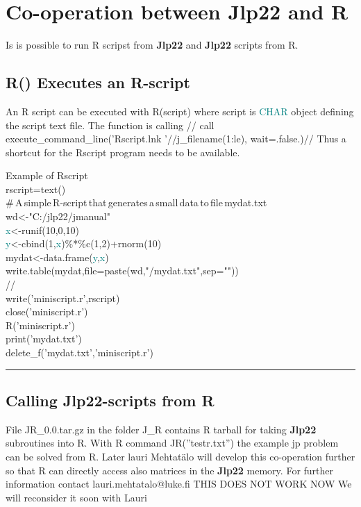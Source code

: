 \section{Co-operation between \textbf{Jlp22} and R} 
\label{JR} 
Is is possible to run R scripst from \textbf{Jlp22} and \textbf{Jlp22} scripts from R. 
\subsection{ \textcolor{VioletRed}{R}() Executes an R-script} 
\label{R} 
An R script can be executed with \textcolor{VioletRed}{R}(script) where script is \textcolor{teal}{CHAR} object 
defining the script text file. The function is calling // 
call execute\_command\_line('Rscript.lnk '//j\_filename(1:le), wait=.false.)// 
Thus a shortcut for the Rscript program needs to be available. 
\singlespacing 
\begin{example}[Rex]Example of Rscript\\ 
\label{Rex} 
\noindent rscript=\textcolor{VioletRed}{text}()\\ 
\#\,A\,simple\,R-script\,that\,generates\,a\,small\,data\,to\,file\,mydat.txt\\ 
wd<-"C:/jlp22/jmanual"\\ 
\textcolor{teal}{x}<-runif(10,0,10)\\ 
\textcolor{teal}{y}<-cbind(1,\textcolor{teal}{x})\%*\%c(1,2)+rnorm(10)\\ 
mydat<-data.frame(\textcolor{teal}{y},\textcolor{teal}{x})\\ 
write.\textcolor{VioletRed}{table}(mydat,file=paste(wd,"/mydat.txt",sep=""))\\ 
//                                                                          \\ 
\textcolor{VioletRed}{write}('miniscript.r',rscript)\\ 
\textcolor{VioletRed}{close}('miniscript.r')\\ 
\textcolor{VioletRed}{R}('miniscript.r')\\ 
\textcolor{VioletRed}{print}('mydat.txt')\\ 
\textcolor{VioletRed}{delete\_f}('mydat.txt','miniscript.r')\\ 
\end{example} 
\vspace{-7mm} \rule{5cm}{0.1pt} 
\onehalfspacing 
\subsection{Calling \textbf{Jlp22}-scripts from R} 
\label{Rcalls} 
File JR\_0.0.tar.gz in the folder J\_R contains R tarball for taking \textbf{Jlp22}  subroutines into R. 
With R command JR(”testr.txt”) the example jp problem can be solved from R. 
Later lauri Mehtat\"alo will develop this co-operation further so that R can directly access also 
matrices in the \textbf{Jlp22} memory. 
For further information contact lauri.mehtatalo@luke.fi 
THIS DOES NOT WORK NOW We will reconsider it soon with Lauri 
